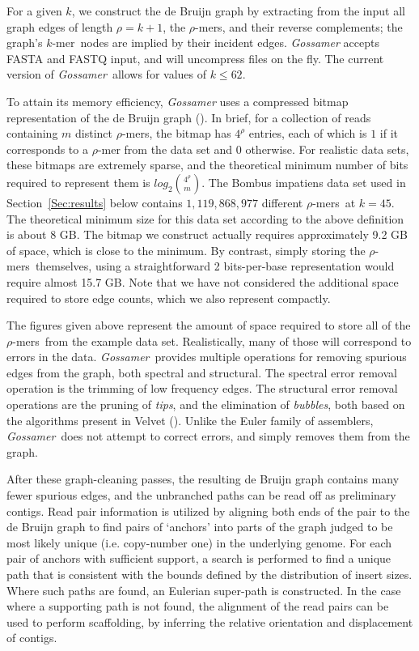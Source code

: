 \documentclass{bioinfo}
\newcommand{\Gossamer}{\textit{Gossamer}}
\newcommand{\rhomer}{$\rho$-mer}
\newcommand{\rhomers}{$\rho$-mers}
\newcommand{\kmer}{$k$-mer}
\begin{document}
For a given $k$, we construct the de Bruijn graph 
by extracting from the input all graph edges
of length $\rho=k+1$, the \rhomers, and their reverse complements;
the graph's \kmer\ nodes are implied by their incident edges.
\Gossamer{} accepts FASTA and FASTQ input,
and will uncompress 
files on the fly.
The current version of \Gossamer{}\ allows for values of $k \le 62$. 

To attain its memory efficiency, \Gossamer{} uses a compressed bitmap representation of the de Bruijn graph (\cite{Conway:2011p17913}). In brief, for a collection of reads containing $m$ distinct \rhomers, the bitmap has $4^\rho$ entries, each of which is $1$ if it corresponds to a \rhomer{} from the data set and  $0$ otherwise.
For realistic data sets, these bitmaps are extremely sparse, and the theoretical minimum number of bits required to represent them is $\mathit{log}_2 \binom{4^\rho}{m}$. The Bombus impatiens data set used in Section~\ref{Sec:results} below contains $1,119,868,977$ different \rhomers\ at $k = 45$. The theoretical minimum size for this data set according to the above definition is about 8 GB. The bitmap we construct actually requires approximately 9.2 GB of space, which is close to the minimum. By contrast, simply storing the \rhomers\ themselves, using a straightforward 2 bits-per-base representation would require almost 15.7 GB. Note that we have not considered the additional space required to store edge counts, which we also represent compactly.

The figures given above represent the amount of space required to store all of the
\rhomers\ from the example data set. Realistically, many of those will correspond to
errors in the data.
\Gossamer{}\ provides multiple operations for removing spurious edges from the graph, 
both spectral and structural.
The spectral error removal operation is the trimming of low frequency edges.
The structural error removal operations are the pruning of \textit{tips}, and
the elimination of \textit{bubbles}, both based on the algorithms present in
Velvet (\cite{Zerbino:2008p731}).
Unlike the Euler family of assemblers, \Gossamer{}\ does not 
attempt to correct errors, and simply removes them from the graph.

After these graph-cleaning passes, the resulting de Bruijn graph contains
many fewer spurious edges, and the unbranched paths can be read off as preliminary contigs.
Read pair information is utilized by aligning both ends of the pair to the de Bruijn graph
to find pairs of `anchors' into parts of the graph judged to be most likely unique (i.e. copy-number one)
in the underlying genome.
For each pair of anchors with sufficient support,
a search is performed to find a unique path that
is consistent with the
bounds defined by the distribution of insert sizes.
Where such paths are found, an Eulerian super-path is constructed.
In the case where a supporting path is not found, the alignment of the read pairs can be used to perform scaffolding, by inferring the relative orientation and displacement of contigs.
\end{document}
